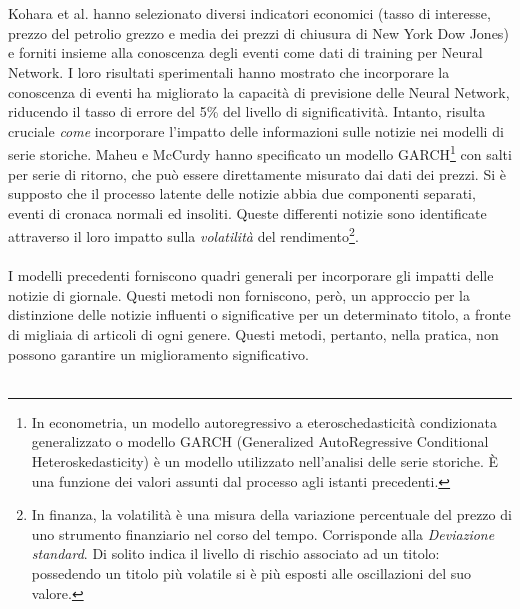 \documentclass[a4paper,12pt]{report}
\begin{document}
\\~\\Kohara et al. \cite{know-nn2} hanno selezionato diversi indicatori economici (tasso di interesse, prezzo del petrolio grezzo e media dei prezzi di chiusura di New York Dow Jones) e forniti insieme alla conoscenza degli eventi come dati di training per Neural Network. I loro risultati sperimentali hanno mostrato che incorporare la conoscenza di eventi ha migliorato la capacità di previsione delle Neural Network, riducendo il tasso di errore del 5\% del livello di significatività. Intanto, risulta cruciale \textit{come} incorporare l'impatto delle informazioni sulle notizie nei modelli di serie storiche. Maheu e McCurdy \cite{26} hanno specificato un modello GARCH\footnote{In econometria, un modello autoregressivo a eteroschedasticità condizionata generalizzato o modello GARCH (Generalized AutoRegressive Conditional Heteroskedasticity) è un modello utilizzato nell'analisi delle serie storiche. È una funzione dei valori assunti dal processo agli istanti precedenti.} con salti per serie di ritorno, che può essere direttamente misurato dai dati dei prezzi. Si è supposto che il processo latente delle notizie abbia due componenti separati, eventi di cronaca normali ed insoliti. Queste differenti notizie sono identificate attraverso il loro impatto sulla \textit{volatilità} del rendimento\footnote{In finanza, la volatilità è una misura della variazione percentuale del prezzo di uno strumento finanziario nel corso del tempo. Corrisponde alla \textit{Deviazione standard}. Di solito indica il livello di rischio associato ad un titolo: possedendo un titolo più volatile si è più esposti alle oscillazioni del suo valore.}.\\~\\ I modelli precedenti forniscono quadri generali per incorporare gli impatti delle notizie di giornale. Questi metodi non forniscono, però, un approccio per la distinzione delle notizie influenti o significative per un determinato titolo, a fronte di migliaia di articoli di ogni genere. Questi metodi, pertanto, nella pratica, non possono garantire un miglioramento significativo. \\~\\
\end{document}
